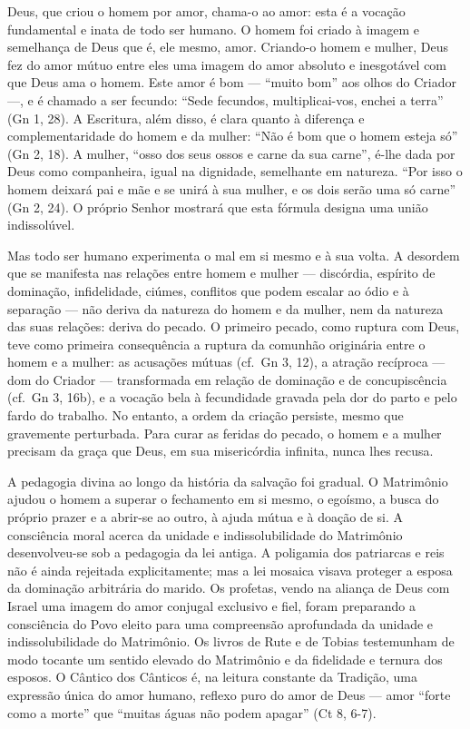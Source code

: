 Deus, que criou o homem por amor, chama-o ao amor: esta é a vocação fundamental e inata de todo ser humano. O homem foi criado à imagem e semelhança de Deus que é, ele mesmo, amor. Criando-o homem e mulher, Deus fez do amor mútuo entre eles uma imagem do amor absoluto e inesgotável com que Deus ama o homem. Este amor é bom --- ``muito bom'' aos olhos do Criador ---, e é chamado a ser fecundo: ``Sede fecundos, multiplicai-vos, enchei a terra'' (Gn 1, 28). A Escritura, além disso, é clara quanto à diferença e complementaridade do homem e da mulher: ``Não é bom que o homem esteja só'' (Gn 2, 18). A mulher, ``osso dos seus ossos e carne da sua carne'', é-lhe dada por Deus como companheira, igual na dignidade, semelhante em natureza. ``Por isso o homem deixará pai e mãe e se unirá à sua mulher, e os dois serão uma só carne'' (Gn 2, 24). O próprio Senhor mostrará que esta fórmula designa uma união indissolúvel.

Mas todo ser humano experimenta o mal em si mesmo e à sua volta. A desordem que se manifesta nas relações entre homem e mulher --- discórdia, espírito de dominação, infidelidade, ciúmes, conflitos que podem escalar ao ódio e à separação --- não deriva da natureza do homem e da mulher, nem da natureza das suas relações: deriva do pecado. O primeiro pecado, como ruptura com Deus, teve como primeira consequência a ruptura da comunhão originária entre o homem e a mulher: as acusações mútuas (cf.~Gn 3, 12), a atração recíproca --- dom do Criador --- transformada em relação de dominação e de concupiscência (cf.~Gn 3, 16b), e a vocação bela à fecundidade gravada pela dor do parto e pelo fardo do trabalho. No entanto, a ordem da criação persiste, mesmo que gravemente perturbada. Para curar as feridas do pecado, o homem e a mulher precisam da graça que Deus, em sua misericórdia infinita, nunca lhes recusa.

A pedagogia divina ao longo da história da salvação foi gradual. O Matrimônio ajudou o homem a superar o fechamento em si mesmo, o egoísmo, a busca do próprio prazer e a abrir-se ao outro, à ajuda mútua e à doação de si. A consciência moral acerca da unidade e indissolubilidade do Matrimônio desenvolveu-se sob a pedagogia da lei antiga. A poligamia dos patriarcas e reis não é ainda rejeitada explicitamente; mas a lei mosaica visava proteger a esposa da dominação arbitrária do marido. Os profetas, vendo na aliança de Deus com Israel uma imagem do amor conjugal exclusivo e fiel, foram preparando a consciência do Povo eleito para uma compreensão aprofundada da unidade e indissolubilidade do Matrimônio. Os livros de Rute e de Tobias testemunham de modo tocante um sentido elevado do Matrimônio e da fidelidade e ternura dos esposos. O Cântico dos Cânticos é, na leitura constante da Tradição, uma expressão única do amor humano, reflexo puro do amor de Deus --- amor ``forte como a morte'' que ``muitas águas não podem apagar'' (Ct 8, 6-7).


